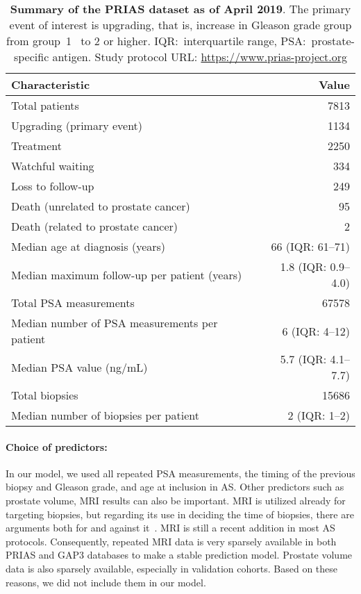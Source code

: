 \begin{table}
\small\sf\centering
\caption{\textbf{Summary of the PRIAS dataset as of April 2019}. The primary event of interest is upgrading, that is, increase in Gleason grade group from group~1~\citep{epsteinGG2014} to 2 or higher. IQR:~interquartile range, PSA:~prostate-specific antigen. Study protocol URL: \url{https://www.prias-project.org}}
\label{table:prias_summary}
\begin{tabular}{lr}
\toprule
\textbf{Characteristic} & \textbf{Value}\\
\midrule
Total patients & 7813\\
Upgrading (primary event) & 1134\\
Treatment & 2250\\
Watchful waiting & 334\\
Loss to follow-up & 249\\
Death (unrelated to prostate cancer) & 95\\
Death (related to prostate cancer) & 2\\
\midrule
Median age at diagnosis (years) & 66 (IQR: 61--71)\\
Median maximum follow-up per patient (years) &  1.8 (IQR: 0.9--4.0)\\
Total PSA measurements & 67578\\
Median number of PSA measurements per patient &  6 (IQR: 4--12)\\
Median PSA value (ng/mL) & 5.7 (IQR: 4.1--7.7)\\
Total biopsies & 15686\\
Median number of biopsies per patient &  2 (IQR: 1--2)\\
\bottomrule
\end{tabular}
\end{table}

\paragraph{Choice of predictors:} In our model, we used all repeated PSA measurements, the timing of the previous biopsy and Gleason grade, and age at inclusion in AS. Other predictors such as prostate volume, MRI results can also be important. MRI is utilized already for targeting biopsies, but regarding its use in deciding the time of biopsies, there are arguments both for and against it~\citep{kasivisvanathan2020magnetic,chesnut2019role,schoots2015magnetic}. MRI is still a recent addition in most AS protocols. Consequently, repeated MRI data is very sparsely available in both PRIAS and GAP3 databases to make a stable prediction model. Prostate volume data is also sparsely available, especially in validation cohorts. Based on these reasons, we did not include them in our model.